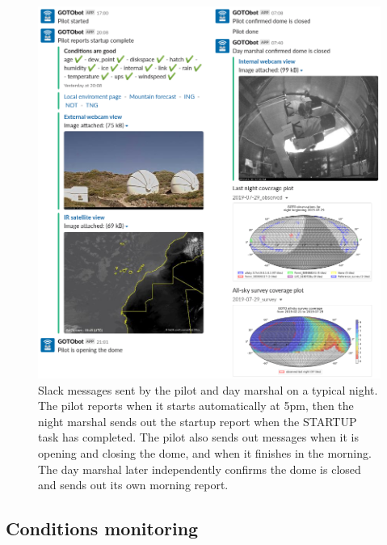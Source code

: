 \begin{colsection}
\begin{colsection}
\begin{figure}[p]
    \begin{center}
    \includegraphics[width=\linewidth]{images/slack2.png}
    \end{center}
    \caption[Slack messages sent by the pilot and day marshal]{
        Slack messages sent by the pilot and day marshal on a typical night. The pilot reports when it starts automatically at 5pm, then the night marshal sends out the startup report when the STARTUP task has completed. The pilot also sends out messages when it is opening and closing the dome, and when it finishes in the morning. The day marshal later independently confirms the dome is closed and sends out its own morning report.
    }\label{fig:pilot_slack}
\end{figure}

\end{colsection}


\subsection{Conditions monitoring}
\label{sec:conditions}
\begin{colsection}


\end{colsection}
\end{colsection}
